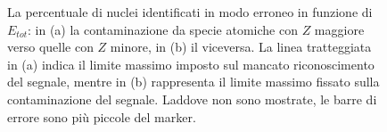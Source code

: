 \begin{figure}[!p] 
	\centering
	\hspace{10mm}
	\caption{La percentuale di nuclei identificati in modo erroneo in funzione di $E_{tot}$: in (a) la contaminazione da specie atomiche con $Z$ maggiore verso quelle con $Z$ minore, in (b) il viceversa. La linea tratteggiata in (a) indica il limite massimo imposto sul mancato riconoscimento del segnale, mentre in (b) rappresenta il limite massimo fissato sulla contaminazione del segnale. Laddove non sono mostrate, le barre di errore sono più piccole del marker.} \label{fig:leakage}
\end{figure}


